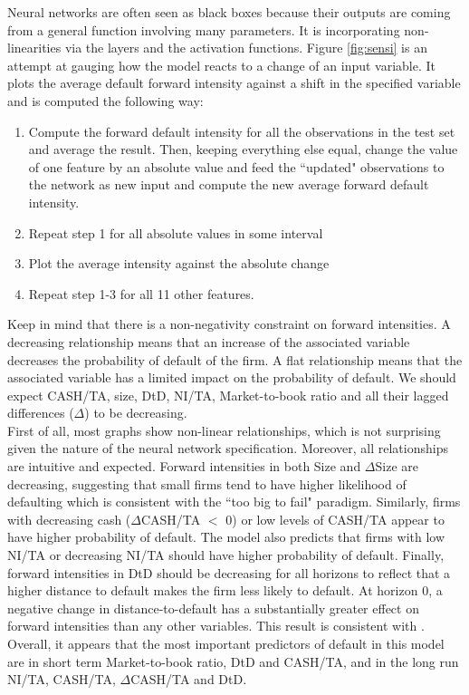 Neural networks are often seen as black boxes because their outputs are coming from a general function involving many parameters. It is incorporating non-linearities via the layers and the activation functions. Figure \ref{fig:sensi} is an attempt at gauging how the model reacts to a change of an input variable. It plots the average default forward intensity against a shift in the specified variable and is computed the following way:

\begin{enumerate}
    \item Compute the forward default intensity for all the observations in the test set and average the result. Then, keeping everything else equal, change the value of one feature by an absolute value and feed the ``updated" observations to the network as new input and compute the new average forward default intensity. 
    \item Repeat step 1 for all absolute values in some interval
    \item Plot the average intensity against the absolute change
    \item Repeat step 1-3 for all 11 other features.
\end{enumerate}

Keep in mind that there is a non-negativity constraint on forward intensities. A decreasing relationship means that an increase of the associated variable decreases the probability of default of the firm. A flat relationship means that the associated variable has a limited impact on the probability of default. We should expect CASH/TA, size, DtD, NI/TA, Market-to-book ratio and all their lagged differences ($\Delta$) to be decreasing. \\

First of all, most graphs show non-linear relationships, which is not surprising given the nature of the neural network specification. Moreover, all relationships are intuitive and expected. Forward intensities in both Size and $\Delta$Size are decreasing, suggesting that small firms tend to have higher likelihood of defaulting which is consistent with the ``too big to fail" paradigm. Similarly, firms with decreasing cash ($\Delta$CASH/TA $<$ 0) or low levels of CASH/TA appear to have higher probability of default. The model also predicts that firms with low NI/TA or decreasing NI/TA should have higher probability of default. Finally, forward intensities in DtD should be decreasing for all horizons to reflect that a higher distance to default makes the firm less likely to default. At horizon 0, a negative change in distance-to-default has a substantially greater effect on forward intensities than any other variables. This result is consistent with \cite{DSW}. Overall,
it appears that the most important predictors of default in this model are in short term Market-to-book ratio, DtD and CASH/TA, and in the long run NI/TA, CASH/TA, $\Delta$CASH/TA and DtD.


